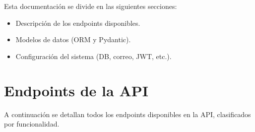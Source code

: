 \documentclass[letterpaper,10pt,spanish]{sphinxmanual}
\begin{document}
\sphinxAtStartPar
Esta documentación se divide en las siguientes secciones:
\begin{itemize}
\item {} 
\sphinxAtStartPar
Descripción de los endpoints disponibles.

\item {} 
\sphinxAtStartPar
Modelos de datos (ORM y Pydantic).

\item {} 
\sphinxAtStartPar
Configuración del sistema (DB, correo, JWT, etc.).

\end{itemize}

\sphinxstepscope


\chapter{Endpoints de la API}
\label{\detokenize{endpoints:endpoints-de-la-api}}\label{\detokenize{endpoints::doc}}
\sphinxAtStartPar
A continuación se detallan todos los endpoints disponibles en la API, clasificados por funcionalidad.
\label{\detokenize{endpoints:module-main}}
\end{document}
